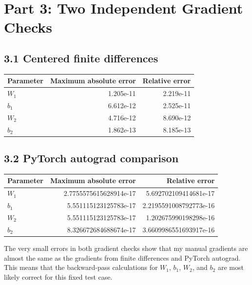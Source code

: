 \documentclass[11pt]{article}
\begin{document}
\section*{Part 3: Two Independent Gradient Checks}

\subsection*{3.1 Centered finite differences}
\begin{center}
  \begin{tabular}{lrr}
    \toprule
    Parameter & Maximum absolute error & Relative error \\
    \midrule
    $W_1$ & 1.205e-11 & 2.219e-11 \\
    $b_1$ & 6.612e-12 & 2.525e-11 \\
    $W_2$ & 4.716e-12 & 8.690e-12 \\
    $b_2$ & 1.862e-13 & 8.185e-13 \\
    \bottomrule
  \end{tabular}
\end{center}

\subsection*{3.2 PyTorch autograd comparison}
\begin{center}
  \begin{tabular}{lrr}
    \toprule
    Parameter & Maximum absolute error & Relative error \\
    \midrule
    $W_1$ & 2.7755575615628914e-17 & 5.692702109414681e-17 \\
    $b_1$ & 5.551115123125783e-17 & 2.2195591008792773e-16 \\
    $W_2$ & 5.551115123125783e-17 & 1.202675990198298e-16 \\
    $b_2$ & 8.326672684688674e-17 & 3.6609986551693917e-16 \\
    \bottomrule
  \end{tabular}
\end{center}

The very small errors in both gradient checks show that my manual gradients are
almost the same as the gradients from finite differences and PyTorch autograd.
This means that the backward-pass calculations for $W_1$, $b_1$, $W_2$, and
$b_2$ are most likely correct for this fixed test case.
\end{document}
